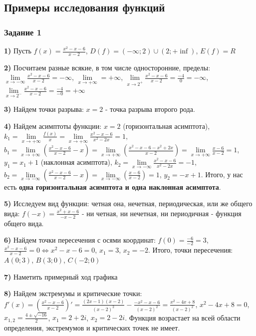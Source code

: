 \documentclass{article}
\begin{document}
\subsection{Примеры исследования функций}

\subsubsection{Задание 1}

\begin{flushleft}

\textbf{1) } Пусть $f(x) = \frac{x^2 - x - 6}{x - 2}$, $D(f) = (-\infty; 2) \cup (2; +\inf)$, $E(f) = R$

\textbf{2) } Посчитаем разные всякие, в том числе односторонние, пределы: $\lim\limits_{x \to -\infty} \frac{x^2 - x - 6}{x - 2} = -\infty$, $\lim\limits_{x \to +\infty} = +\infty$, $\lim\limits_{x \to 2^{+}} \frac{x^2 - x - 6}{x - 2} = \frac{-4}{0} = -\infty$, $\lim\limits_{x \to 2^{-}} \frac{x^2 - x - 6}{x - 2} = \frac{-4}{-0} = +\infty$

\textbf{3) } Найдем точки разрыва: $x = 2$ - точка разрыва второго рода.

\textbf{4) } Найдем асимптоты функции: $x = 2$ (горизонтальная асимптота), $k_1 = \lim\limits_{x \to +\infty} \frac{f(x)}{x} = \lim\limits_{x \to +\infty} \frac{x^2 - x - 6}{x^2 - 2x} = 1$, $b_1 = \lim\limits_{x \to +\infty} (\frac{x^2 - x - 6}{x - 2} - x) = \lim\limits_{x \to +\infty} (\frac{x^2 - x - 6 - x^2 + 2x}{x - 2}) = \lim\limits_{x \to +\infty} \frac{x - 6}{x - 2} = 1$, $y_1 = x_1 + 1$ (наклонная асимптота), $k_2 = \lim\limits_{x \to -\infty} \frac{x^2 - x - 6}{x^2 - 2x} = -1$, $b_2 = \lim\limits_{x \to -\infty} (\frac{x^2 - x - 6}{x - 2} - x) = \lim\limits_{x \to -\infty} (\frac{x - 6}{x - 2}) = 1$, $y_2 = -x + 1$. Итого, у нас есть \textbf{одна горизонтальная асимптота и одна наклонная асимптота}.

\textbf{5) } Исследуем вид функции: четная она, нечетная, периодическая, или же общего вида: $f(-x) = \frac{x^2 + x - 6}{-x - 2}$ - ни четная, ни нечетная, ни периодичная - функция общего вида.

\textbf{6) } Найдем точки пересечения с осями координат: $f(0) = \frac{-6}{-2} = 3$, $\frac{x^2 - x - 6}{x - 2} = 0 \Longleftrightarrow x^2 - x - 6 = 0$, $x_1 = 3$, $x_2 = -2$. Итого, точки пересечения: $A(0; 3)$, $B(3; 0)$, $C(-2; 0)$

\textbf{7) } Наметить примерный ход графика

\textbf{8) } Найдем экстремумы и критические точки: $f'(x) = (\frac{x^2 - x - 6}{x - 2})' = \frac{(2x - 1)(x - 2)}{(x - 2)^2} - \frac{-x^2 - x - 6}{(x - 2)^2} = \frac{x^2 - 4x + 8}{(x - 2)^2}$, $x^2 - 4x + 8 = 0$, $x_{1, 2} = \frac{4 \pm \sqrt{-16}}{2}$, $x_1 = 2 + 2i$, $x_2 = 2 - 2i$. Функция возрастает на всей области определения, экстремумов и критических точек не имеет.


\end{flushleft}
\end{document}
